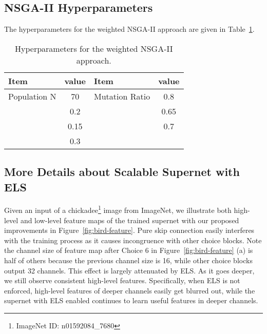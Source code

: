 \documentclass[runningheads]{llncs}
\begin{document}
\subsection{NSGA-II Hyperparameters}
The hyperparameters for the weighted NSGA-II approach are given in Table~\ref{tab:pipelienhyper}.

\begin{table}[ht]
	\caption{Hyperparameters for the weighted NSGA-II approach.}
	\label{tab:pipelienhyper}
\begin{center}
		\begin{small}
				\begin{tabular}{|l|c|l|c|}
					\hline
					Item & value & Item & value \\
					\hline
					Population N & 70 & Mutation Ratio  & 0.8 \\
					 & 0.2 &    & 0.65 \\
					 & 0.15 &  & 0.7 \\
					 & 0.3 & & \\
					\hline
				\end{tabular}
		\end{small}
	\end{center}
\end{table}

\subsection{More Details about Scalable Supernet with ELS}
Given an input of a chickadee\footnote{ImageNet ID: n01592084\_7680} image from ImageNet, we illustrate both high-level and low-level feature maps of the trained supernet with our proposed improvements in Figure~\ref{fig:bird-feature}. Pure skip connection easily interferes with the training process as it causes incongruence with other choice blocks. Note the channel size of feature map after Choice 6 in Figure~\ref{fig:bird-feature} (a) is half of others because the previous channel size is 16, while other choice blocks output 32 channels. This effect is largely attenuated by ELS. As it goes deeper, we still observe consistent high-level features. Specifically, when ELS is not enforced, high-level features of deeper channels easily get blurred out, while the supernet with ELS enabled continues to learn useful features in deeper channels. 

\begin{figure*}[ht]
	\centering
	\caption{Learned low-level and high-level features for the supernet with and without ELS.}
	\label{fig:bird-feature}
	\vskip -0.1in
\end{figure*}
\end{document}
